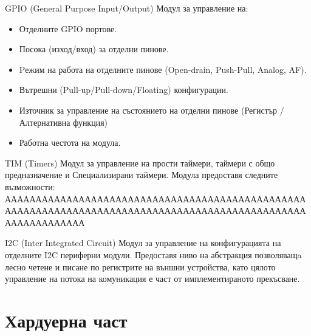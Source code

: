 \documentclass[handout]{beamer}
\begin{document}
\begin{frame}

	\begin{block}{GPIO (General Purpose Input/Output)}
		Модул за управление на:
		 \begin{itemize}
			 \item Отделните GPIO портове.
			 \item Посока (изход/вход) за отделни пинове.
			 \item Pежим на работа на отделните пинове (Open-drain, Push-Pull, Analog, AF).
			 \item Вътрешни (Pull-up/Pull-down/Floating) конфигурации.
			 \item Източник за управление на състоянието на отделни пинове (Регистър / Алтернативна функция)
			 \item Работна честота на модула.
	 	\end{itemize}
	\end{block}

\end{frame}

\begin{frame}

	\begin{block}{TIM (Timers)}
		Модул за управление на прости таймери, таймери с общо предназначение и Специализирани таймери.
		Модула предоставя следните възможности:
		ААААААААААААААААААААААААААААААААААААААААААААААААААААААААААААААААААААААААААААААААААААААААААААААААААААААААААААААА
	\end{block}

\end{frame}

\begin{frame}[t]

	\begin{block}{I2C (Inter Integrated Circuit)}
		Модул за управление на конфигурацията на отделните I2C периферни модули.
		Предоставя ниво на абстракция позволяващa лесно четене и писане по регистрите на външни устройства, 
		като цялото управление на потока на комуникация е част от имплементираното прекъсване.
	\end{block}



\end{frame}

\section{Хардуерна част}
\end{document}
